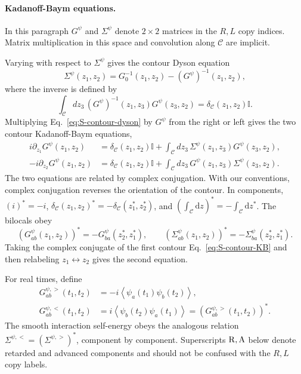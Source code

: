\documentclass[11pt,a4paper]{article}
\begin{document}
\paragraph*{Kadanoff-Baym equations.}

In this paragraph \(G^\psi\) and \(\Sigma^\psi\) denote \(2\times2\) matrices
in the \(R,L\) copy indices. Matrix multiplication in this space and
convolution along \(\mathcal C\) are implicit.

Varying with respect to \(\Sigma^\psi\) gives the contour Dyson equation
\begin{equation}
\Sigma^\psi(z_1,z_2)
=
G_0^{-1}(z_1,z_2)
-
\left(G^\psi\right)^{-1}(z_1,z_2),
\label{eq:S-contour-dyson}
\end{equation}
where the inverse is defined by
\begin{equation}
\int_{\mathcal C}dz_3\,
\left(G^\psi\right)^{-1}(z_1,z_3)
G^\psi(z_3,z_2)
=
\delta_{\mathcal C}(z_1,z_2)\mathbb I .
\label{eq:S-contour-inverse}
\end{equation}
Multiplying Eq.~\eqref{eq:S-contour-dyson} by \(G^\psi\) from the right or
left gives the two contour Kadanoff-Baym equations,
\begin{equation}
\begin{aligned}
i\partial_{z_1}G^\psi(z_1,z_2)
&=
\delta_{\mathcal C}(z_1,z_2)\mathbb I
+
\int_{\mathcal C}dz_3\,
\Sigma^\psi(z_1,z_3)G^\psi(z_3,z_2),
\\
-i\partial_{z_2}G^\psi(z_1,z_2)
&=
\delta_{\mathcal C}(z_1,z_2)\mathbb I
+
\int_{\mathcal C}dz_3\,
G^\psi(z_1,z_3)\Sigma^\psi(z_3,z_2).
\end{aligned}
\label{eq:S-contour-KB}
\end{equation}
The two equations are related by complex conjugation.
With our conventions, complex conjugation reverses the orientation of the
contour.  In components,
\((i)^*=-i\),
\(\delta_{\mathcal{C}}(z_1,z_2)^*
=-\delta_{\mathcal{C}}(z_1^*,z_2^*)\), and
\(\left(\int_{\mathcal{C}}\mathrm{d}z\right)^*
=-\int_{\mathcal{C}}\mathrm{d}z^*\).  The bilocals obey
\[
  \left(G^\psi_{ab}(z_1,z_2)\right)^*
  =
  -G^\psi_{ba}(z_2^*,z_1^*),
  \qquad
  \left(\Sigma^\psi_{ab}(z_1,z_2)\right)^*
  =
  -\Sigma^\psi_{ba}(z_2^*,z_1^*) .
\]
Taking the complex conjugate of the first contour Eq.~\eqref{eq:S-contour-KB} and then relabeling
\(z_1\leftrightarrow z_2\) gives the second equation.

For real times, define
\begin{equation}
\begin{aligned}
G^{\psi,>}_{ab}(t_1,t_2)
&=
-i\left\langle
\psi_a(t_1)\psi_b(t_2)
\right\rangle,
\\
G^{\psi,<}_{ab}(t_1,t_2)
&=
i\left\langle
\psi_b(t_2)\psi_a(t_1)
\right\rangle
=
\left(
G^{\psi,>}_{ab}(t_1,t_2)
\right)^* .
\end{aligned}
\label{eq:S-greater-lesser}
\end{equation}
The smooth interaction self-energy obeys the analogous relation
\(\Sigma^{\psi,<}=(\Sigma^{\psi,>})^*\), component by component.
Superscripts \({\rm R},{\rm A}\) below denote retarded and advanced
components and should not be confused with the \(R,L\) copy labels.
\end{document}
